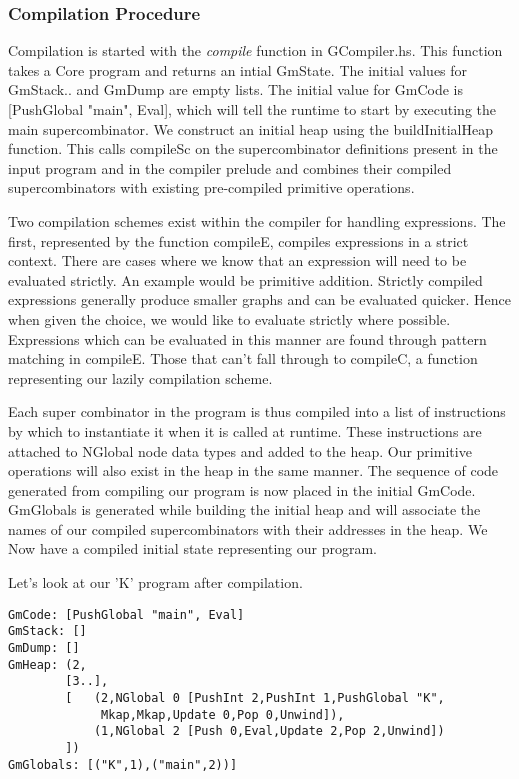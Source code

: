 \subsubsection{Compilation Procedure}
Compilation is started with the \emph{compile} function in 
GCompiler.hs. This function takes a Core program and 
returns an intial GmState. The initial values for GmStack..
and GmDump are empty lists. The initial value for GmCode
is [PushGlobal "main", Eval], which will tell the runtime
to start by executing the main supercombinator. We construct 
an initial heap using the buildInitialHeap
function. This calls compileSc on the supercombinator definitions 
present in the input program and in the compiler prelude and combines 
their compiled supercombinators with existing pre-compiled
primitive operations. 

Two compilation schemes exist within the compiler for handling
expressions. The first, represented by the function compileE,
compiles expressions in a strict context. There are cases 
where we know that an expression will need to be evaluated
strictly. An example would be primitive addition. Strictly
compiled expressions generally produce smaller graphs and can
be evaluated quicker. Hence when given the choice, we would
like to evaluate strictly where possible. Expressions which
can be evaluated in this manner are found through pattern
matching in compileE. Those that can't fall through to
compileC, a function representing our lazily compilation
scheme. 

Each super combinator in the program is thus compiled into
a list of instructions by which to instantiate it when it
is called at runtime. These instructions are attached to
NGlobal node data types and added to the heap. Our primitive
operations will also exist in the heap in the same manner.
The sequence of code generated from compiling our program
is now placed in the initial GmCode. GmGlobals is generated
while building the initial heap and will associate the names
of our compiled supercombinators with their addresses in the
heap. We Now have a compiled initial state representing our
program. 

Let's look at our 'K' program after compilation.

\begin{verbatim}
GmCode: [PushGlobal "main", Eval]
GmStack: []
GmDump: []
GmHeap:	(2, 
		[3..],  
		[	(2,NGlobal 0 [PushInt 2,PushInt 1,PushGlobal "K",
			 Mkap,Mkap,Update 0,Pop 0,Unwind]),
			(1,NGlobal 2 [Push 0,Eval,Update 2,Pop 2,Unwind])
		])
GmGlobals: [("K",1),("main",2))]

\end{verbatim}

